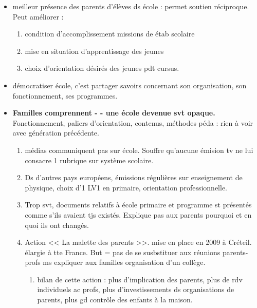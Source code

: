\documentclass[12pt]{article}
\begin{document}
\begin{itemize}
\item meilleur présence des parents d'élèves ds école : permet soutien réciproque. Peut améliorer : 
\begin{enumerate}
\item condition d'accomplissement missions de étab scolaire \\
\item mise en situation d'apprentissage des jeunes \\
\item choix d'orientation désirés des jeunes pdt cursus. \\
\end{enumerate}

\item démocratiser école, c'est partager savoirs concernant son organisation, son fonctionnement, ses programmes.\\

\item \textbf{Familles comprennent - - une école devenue svt opaque.} Fonctionnement, paliers d'orientation, contenus, méthodes péda : rien à voir avec génération précédente.\\
\begin{enumerate}
\item médias communiquent pas sur école. Souffre qu'aucune émision tv ne lui consacre 1 rubrique sur système scolaire.\\
\item Ds d'autres pays européens, émissions régulières sur enseignement de physique, choix d'1 LV1 en primaire, orientation professionnelle.\\
\item Trop svt, documents relatifs à école primaire et programme st présentés comme s'ils avaient tjs existés. Explique pas aux parents pourquoi et en quoi ils ont changés.\\
\item Action << La malette des parents >>. mise en place en 2009 à Créteil. élargie à tte France. But = pas de se susbstituer aux réunions parents-profs ms expliquer aux familles organisation d'un collège.\\
\begin{enumerate}
\item bilan de cette action : plus d'implication des parents, plus de rdv individuels ac profs, plus d'investissements ds organisations de parents, plus gd contrôle des enfants à la maison.\\
\end{enumerate}
\end{enumerate}


\end{itemize}
\end{document}
